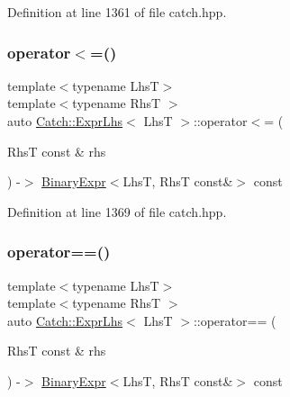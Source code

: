 Definition at line 1361 of file catch.\+hpp.

\mbox{\label{class_catch_1_1_expr_lhs_a6bd8a22c1a7fe2f66d71d7196f20af4f}} 
\subsubsection{\texorpdfstring{operator$<$=()}{operator<=()}}
{\footnotesize\ttfamily template$<$typename LhsT$>$ \\
template$<$typename RhsT $>$ \\
auto \mbox{\hyperlink{class_catch_1_1_expr_lhs}{Catch\+::\+Expr\+Lhs}}$<$ LhsT $>$\+::operator$<$= (\begin{DoxyParamCaption}\item[{RhsT const \&}]{rhs }\end{DoxyParamCaption}) -\/$>$ \mbox{\hyperlink{class_catch_1_1_binary_expr}{Binary\+Expr}}$<$LhsT, RhsT const\&$>$ const \hspace{0.3cm}{\ttfamily [inline]}}



Definition at line 1369 of file catch.\+hpp.

\mbox{\label{class_catch_1_1_expr_lhs_a3068adff1dbbaeec62ffc368d4d6cc4d}} 
\subsubsection{\texorpdfstring{operator==()}{operator==()}\hspace{0.1cm}{\footnotesize\ttfamily [1/2]}}
{\footnotesize\ttfamily template$<$typename LhsT$>$ \\
template$<$typename RhsT $>$ \\
auto \mbox{\hyperlink{class_catch_1_1_expr_lhs}{Catch\+::\+Expr\+Lhs}}$<$ LhsT $>$\+::operator== (\begin{DoxyParamCaption}\item[{RhsT const \&}]{rhs }\end{DoxyParamCaption}) -\/$>$ \mbox{\hyperlink{class_catch_1_1_binary_expr}{Binary\+Expr}}$<$LhsT, RhsT const\&$>$ const \hspace{0.3cm}{\ttfamily [inline]}}



